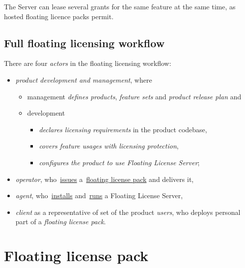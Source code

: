 \documentclass[12pt]{report}
\begin{document}
The Server can lease several grants for the same feature at the same time, as hosted floating licence packs permit.

\section*{Full floating licensing workflow}

There are four \textit{actors} in the floating licensing workflow:

\begin{itemize}

	\item \textit{product development and management}, where
		\begin{itemize}
		    \item management \textit{defines products}, \textit{feature sets} and \textit{product release plan} and
		    \item development
		    	\begin{itemize}
		      		\item \textit{declares licensing requirements} in the product codebase,
		      		\item  \textit{covers feature usages with licensing protection},
		      		\item  \textit{configures the product to use Floating License Server};
		      	\end{itemize}
      	\end{itemize}
	\item \textit{operator}, who~\hyperref[ch:issue-flp]{issues} a~\hyperref[ch:flp]{floating license pack} and delivers it,  
	\item \textit{agent}, who~\hyperref[ch:install-fls]{installs} and~\hyperref[ch:run-fls]{runs} a Floating License Server,
	\item \textit{client} as a representative of set of the product \textit{users}, who 
    deploys personal part of a \textit{floating license pack}.

\end{itemize} 

\chapter*{Floating license pack} \label{ch:flp}

\end{document}
